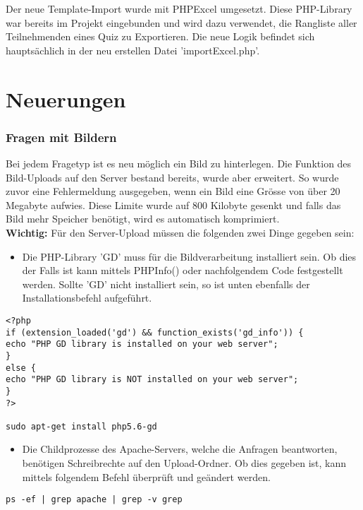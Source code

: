 Der neue Template-Import wurde mit PHPExcel \cite{phpexcel} umgesetzt. Diese PHP-Library war bereits im Projekt eingebunden und wird dazu verwendet, die Rangliste aller Teilnehmenden eines Quiz zu Exportieren. Die neue Logik befindet sich hauptsächlich in der neu erstellen Datei 'importExcel.php'.

\section{Neuerungen}

\subsubsection{Fragen mit Bildern}
Bei jedem Fragetyp ist es neu möglich ein Bild zu hinterlegen. Die Funktion des Bild-Uploads auf den Server bestand bereits, wurde aber erweitert. So wurde zuvor eine Fehlermeldung ausgegeben, wenn ein Bild eine Grösse von über 20 Megabyte aufwies. Diese Limite wurde auf 800 Kilobyte gesenkt und falls das Bild mehr Speicher benötigt, wird es automatisch komprimiert.
\\

\textbf{Wichtig:} 
Für den Server-Upload müssen die folgenden zwei Dinge gegeben sein:
\begin{itemize}
	\item Die PHP-Library 'GD' muss für die Bildverarbeitung installiert sein. Ob dies der Falls ist kann mittels PHPInfo() oder nachfolgendem Code festgestellt werden. \cite{zoopable.com} Sollte 'GD' nicht installiert sein, so ist unten ebenfalls der Installationsbefehl aufgeführt. \cite{askubuntu.com_php_extension}
\end{itemize}
\begin{lstlisting}
<?php
if (extension_loaded('gd') && function_exists('gd_info')) {
echo "PHP GD library is installed on your web server";
}
else {
echo "PHP GD library is NOT installed on your web server";
}
?>

sudo apt-get install php5.6-gd
\end{lstlisting}

\begin{itemize}
	\item Die Childprozesse des Apache-Servers, welche die Anfragen beantworten, benötigen Schreibrechte auf den Upload-Ordner. Ob dies gegeben ist, kann mittels folgendem Befehl überprüft und geändert werden. \cite{askubuntu.com_permissions} 
\end{itemize}
\begin{lstlisting}
ps -ef | grep apache | grep -v grep
\end{lstlisting}

